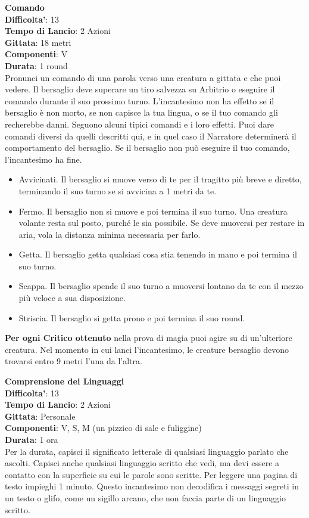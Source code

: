 \begin{multicols}{2}
\medskip\textbf{Comando}\\
\textbf{Difficolta'}: 13\\
\textbf{Tempo di Lancio}: 2 Azioni\\
\textbf{Gittata}: 18 metri\\
\textbf{Componenti}: V\\
\textbf{Durata}: 1 round\\
Pronunci un comando di una parola verso una creatura a gittata e che puoi vedere. Il bersaglio deve superare un tiro salvezza su Arbitrio o eseguire il comando durante il suo prossimo turno. L’incantesimo non ha effetto se il bersaglio è non morto, se non capisce la tua lingua, o se il tuo comando gli recherebbe danni. Seguono alcuni tipici comandi e i loro effetti. Puoi dare comandi diversi da quelli descritti qui, e in quel caso il Narratore determinerà il comportamento del bersaglio. Se il bersaglio non può eseguire il tuo comando, l’incantesimo ha fine.
\begin{itemize}
	\item 
Avvicinati. Il bersaglio si muove verso di te per il tragitto più breve e diretto, terminando il suo turno se si avvicina a 1 metri da te.
	\item 
Fermo. Il bersaglio non si muove e poi termina il suo turno. Una creatura volante resta sul posto, purché le sia possibile. Se deve muoversi per restare in aria, vola la distanza minima necessaria per farlo.
	\item 
	Getta. Il bersaglio getta qualsiasi cosa stia tenendo in mano e poi termina il suo turno. 	\item 
	Scappa. Il bersaglio spende il suo turno a muoversi lontano da te con il mezzo più veloce a sua disposizione.
	\item  Striscia. Il bersaglio si getta prono e poi termina il suo round.
\end{itemize}

\textbf{Per ogni Critico ottenuto} nella prova di magia puoi agire su di un’ulteriore creatura. Nel momento in cui lanci l’incantesimo, le creature bersaglio devono trovarsi entro 9 metri l’una da l’altra.


\medskip\textbf{Comprensione dei Linguaggi}\\
\textbf{Difficolta'}: 13\\
\textbf{Tempo di Lancio}: 2 Azioni\\
\textbf{Gittata}: Personale\\
\textbf{Componenti}: V, S, M (un pizzico di sale e fuliggine)\\
\textbf{Durata}: 1 ora\\
Per la durata, capisci il significato letterale di qualsiasi linguaggio parlato che ascolti. Capisci anche qualsiasi linguaggio scritto che vedi, ma devi essere a contatto con la superficie su cui le parole sono scritte. Per leggere una pagina di testo impieghi 1 minuto. Questo incantesimo non decodifica i messaggi segreti in un testo o glifo, come un sigillo arcano, che non faccia parte di un linguaggio scritto.



\end{multicols}
